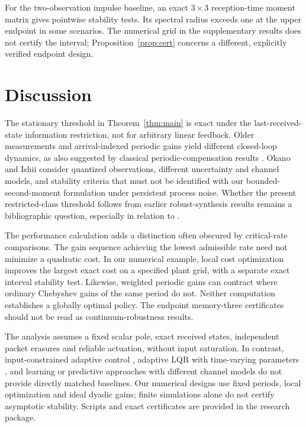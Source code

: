 \documentclass[preprint,12pt,numbers]{elsarticle}
\theoremstyle{definition}
\begin{document}
For the two-observation impulse baseline, an exact $3\times3$ reception-time moment matrix gives pointwise stability tests. Its spectral radius exceeds one at the upper endpoint in some scenarios. The numerical grid in the supplementary results does not certify the interval; Proposition~\ref{prop:cert} concerns a different, explicitly verified endpoint design.

\section{Discussion}

The stationary threshold in Theorem~\ref{thm:main} is exact under the last-received-state information restriction, not for arbitrary linear feedback. Older measurements and arrival-indexed periodic gains yield different closed-loop dynamics, as also suggested by classical periodic-compensation results \citep{khargonekar1985periodic}. Okano and Ishii \citep{okano2012lossy,okano2013,okano2014markov,okano2015} consider quantized observations, different uncertainty and channel models, and stability criteria that must not be identified with our bounded-second-moment formulation under persistent process noise. Whether the present restricted-class threshold follows from earlier robust-synthesis results remains a bibliographic question, especially in relation to \citet{elia2005,silvapulgar2011,eliaeisenbeis2011}.

The performance calculation adds a distinction often obscured by critical-rate comparisons. The gain sequence achieving the lowest admissible rate need not minimize a quadratic cost. In our numerical example, local cost optimization improves the largest exact cost on a specified plant grid, with a separate exact interval stability test. Likewise, weighted periodic gains can contract where ordinary Chebyshev gains of the same period do not. Neither computation establishes a globally optimal policy. The endpoint memory-three certificates should not be read as continuum-robustness results.


The analysis assumes a fixed scalar pole, exact received states, independent packet erasures and reliable actuation, without input saturation. In contrast, input-constrained adaptive control \citep{siriya2022}, adaptive LQR with time-varying parameters \citep{bartos2026}, and learning or predictive approaches with different channel models \citep{zhang2025,sun2025} do not provide directly matched baselines. Our numerical designs use fixed periods, local optimization and ideal dyadic gains; finite simulations alone do not certify asymptotic stability. Scripts and exact certificates are provided in the research package.
\end{document}
